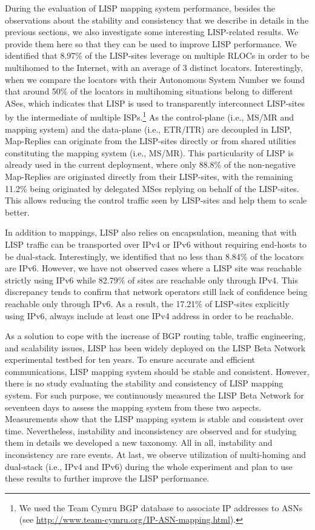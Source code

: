 During the evaluation of LISP mapping system performance, besides the observations about the stability and consistency that we describe in details in the previous sections, we also investigate some interesting LISP-related results. We provide them here so that they can be used to improve LISP performance. We identified that 8.97\% of the LISP-sites leverage on multiple RLOCs in order to be multihomed to the Internet, with an average of 3 distinct locators. Interestingly, when we compare the locators with their Autonomous System Number we found that around 50\% of the locators in multihoming situations belong to different ASes, which indicates that LISP is used to transparently interconnect LISP-sites by the intermediate of multiple ISPs.\footnote{We used the Team Cymru BGP database to associate IP addresses to ASNs (see \url{http://www.team-cymru.org/IP-ASN-mapping.html}).} As the control-plane (i.e., MS/MR and mapping system) and the data-plane (i.e., ETR/ITR) are decoupled in LISP, Map-Replies can originate from the LISP-sites directly or from shared utilities constituting the mapping system (i.e., MS/MR). This particularity of LISP is already used in the current deployment, where only 88.8\% of the non-negative Map-Replies are originated directly from their LISP-sites, with the remaining 11.2\% being originated by delegated MSes replying on behalf of the LISP-sites. This allows reducing the control traffic seen by LISP-sites and help them to scale better.

In addition to mappings, LISP also relies on encapsulation, meaning that with LISP traffic can be transported over IPv4 or IPv6 without requiring end-hosts to be dual-stack. Interestingly, we identified that no less than 8.84\% of the locators are IPv6. However, we have not observed cases where a LISP site was reachable strictly using IPv6 while 82.79\% of sites are reachable only through IPv4. This discrepancy tends to confirm that network operators still lack of confidence being reachable only through IPv6. As a result, the 17.21\% of LISP-sites explicitly using IPv6, always include at least one IPv4 address in order to be reachable.

As a solution to cope with the increase of BGP routing table, traffic engineering, and scalability issues, LISP has been widely deployed on the LISP Beta Network experimental testbed for ten years. To ensure accurate and efficient communications, LISP mapping system should be stable and consistent. However, there is no study evaluating the stability and consistency of LISP mapping system. For such purpose, we continuously measured the LISP Beta Network for seventeen days to assess the mapping system from these two aspects. Measurements show that the LISP mapping system is stable and consistent over time. Nevertheless, instability and inconsistency are observed and for studying them in details we developed a new taxonomy. All in all, instability and inconsistency are rare events. At last, we observe utilization of multi-homing and dual-stack (i.e., IPv4 and IPv6) during the whole experiment and plan to use these results to further improve the LISP performance.